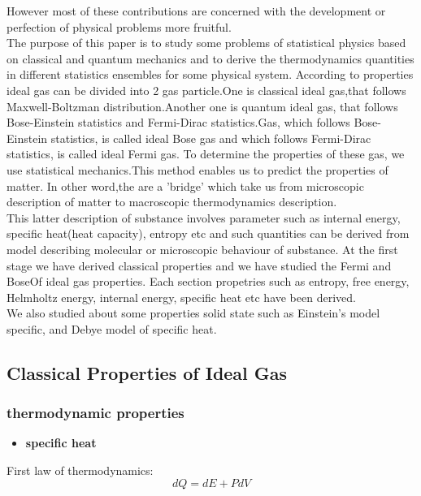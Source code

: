 \documentclass{article}
\newcommand*{\1}{\hspace{1pt}}
\begin{document}
However most of these contributions are concerned with the development or perfection of physical problems more fruitful.\\

The purpose of this paper is to study some problems of statistical physics based on classical and quantum mechanics and to derive the thermodynamics quantities in different statistics ensembles for some physical system. According to properties ideal gas can be divided into 2 gas particle.One is classical ideal gas,that follows Maxwell-Boltzman distribution.Another one is quantum ideal gas, that follows Bose-Einstein statistics and Fermi-Dirac statistics.Gas, which follows Bose-Einstein  statistics, is called ideal Bose gas and which follows Fermi-Dirac statistics, is called ideal Fermi gas.
To determine the properties of these gas, we use statistical mechanics.This method enables us to predict the properties of matter. In other word,the are a 'bridge' which take us from microscopic description of matter to macroscopic thermodynamics description.\\

This latter description of substance involves parameter such as internal energy, specific heat(heat capacity), entropy etc and such quantities can be derived from model describing molecular or microscopic behaviour of substance. At the first stage we have derived classical properties and we have studied the Fermi and BoseOf ideal gas properties. Each section propetries such as entropy, free energy, Helmholtz energy, internal energy, specific heat etc have been derived. \\ 
We also studied about some properties solid state such as Einstein's model specific, and Debye model of specific heat.
\newpage

\subsection{Classical Properties of Ideal Gas}
\subsubsection{thermodynamic properties}
\begin{itemize}
\item \textbf{specific heat}
    
\end{itemize}
First law of thermodynamics:\\ 
\begin{equation}
dQ=dE+PdV
\end{equation}
\end{document}
